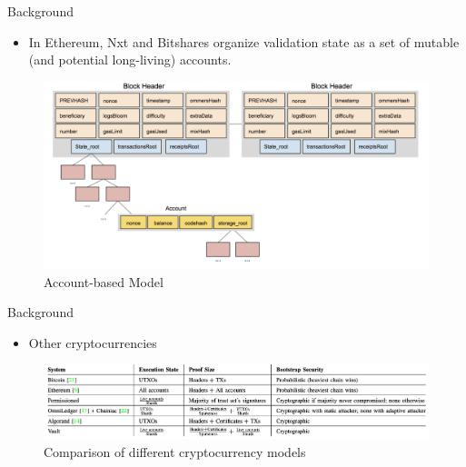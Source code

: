 \documentclass[biblatex,aspectratio=169,11pt]{mybeamer}
\begin{document}
\begin{frame}{Background}
  \begin{itemize}
    \item In Ethereum, Nxt and Bitshares organize \alert{validation state} as a set of mutable (and potential long-living) \alert{accounts}.
  \end{itemize}
  \vspace{-1em}
  \begin{figure}
    \includegraphics[width=0.7\linewidth]{figs/account.png}
    \caption{Account-based Model}
  \end{figure}
\end{frame}

\begin{frame}{Background}
  \begin{itemize}
    \item Other cryptocurrencies
  \end{itemize}
  \vspace{-1em}
  \begin{figure}
    \includegraphics[width=0.9\linewidth]{figs/summary.png}
    \caption{Comparison of different cryptocurrency models }
  \end{figure}
\end{frame}
\end{document}
